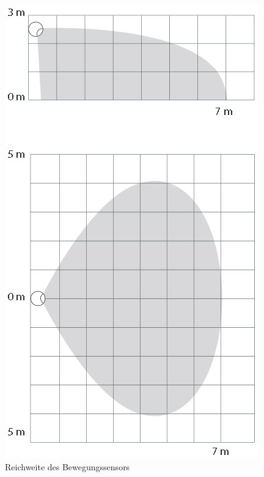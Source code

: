 \begin{figure}[h!]
	\centering
	\includegraphics[scale=0.4]{img/Sensorevaluation/FibaroMultiRange.png}
	\caption{Reichweite des Bewegungssensors}
	\label{fig:sensorenFibaroMultiRange}
\end{figure}
 
